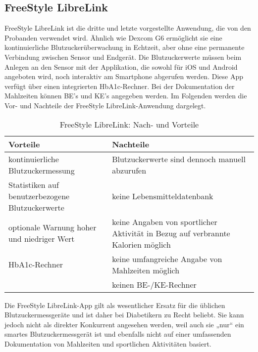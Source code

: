 	\subsection{FreeStyle LibreLink}
	FreeStyle LibreLink ist die dritte und letzte vorgestellte Anwendung, die von den Probanden verwendet wird. Ähnlich wie Dexcom G6 ermöglicht sie eine kontinuierliche Blutzuckerüberwachung in Echtzeit, aber ohne eine permanente Verbindung zwischen Sensor und Endgerät. Die Blutzuckerwerte müssen beim Anlegen an den Sensor mit der Applikation, die sowohl für iOS und Android angeboten wird, noch interaktiv am Smartphone abgerufen werden. Diese App verfügt über einen integrierten HbA1c-Rechner. Bei der Dokumentation der Mahlzeiten können BE’s und KE’s angegeben werden. \newline
	Im Folgenden werden die Vor- und Nachteile der FreeStyle LibreLink-Anwendung dargelegt. \cite{AD}
	\begin{table}[H]
		\setlength{\tabcolsep}{12pt}
		\centering
		\begin{tabular}{p{6cm}|p{6cm}}
			\toprule
			\textbf{Vorteile} & \textbf{Nachteile}\\
			\hline
			kontinuierliche Blutzuckermessung & Blutzuckerwerte sind dennoch manuell abzurufen\\
			\hline
			Statistiken auf benutzerbezogene Blutzuckerwerte & keine Lebensmitteldatenbank\\
			\hline
			optionale Warnung hoher und niedriger Wert & keine Angaben von sportlicher Aktivität in Bezug auf verbrannte Kalorien möglich\\
			\hline
			HbA1c-Rechner & keine umfangreiche Angabe von Mahlzeiten möglich\\
			\hline
			 & keinen BE-/KE-Rechner\\
			\bottomrule
		\end{tabular}
		\captionsetup{justification=centering}
		\caption{FreeStyle LibreLink: Nach- und Vorteile}
		\label{tab:Libre}
	\end{table}
	\setlength{\parindent}{0pt}Die FreeStyle LibreLink-App gilt als wesentlicher Ersatz für die üblichen Blutzuckermessgeräte und ist daher bei Diabetikern zu Recht beliebt. Sie kann jedoch nicht als direkter Konkurrent angesehen werden, weil auch sie „nur“ ein smartes Blutzuckermessgerät ist und ebenfalls nicht auf einer umfassenden Dokumentation von Mahlzeiten und sportlichen Aktivitäten basiert.
